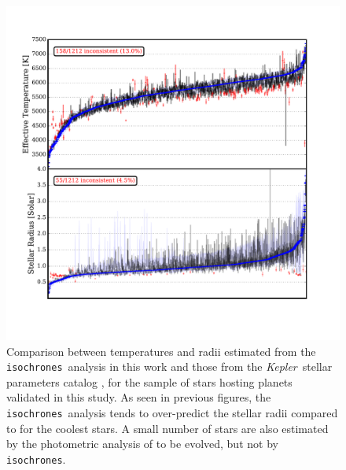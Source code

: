 \documentclass{emulateapj}
\newcommand{\figlabel}[1]{\label{fig:#1}}
\newcommand{\kepler}{\textit{Kepler}}
\newcommand{\isochrones}{\texttt{isochrones}}
\begin{document}
\begin{figure}[p]
\begin{center}
\includegraphics[width=7in]{figures/validated_compare.pdf}
\end{center}
\caption{Comparison between temperatures and radii estimated from the
  \isochrones\ analysis in this work and those from the
  \kepler\ stellar parameters catalog , for the 
  sample of stars hosting planets validated in this study.  As 
  seen in previous figures, the \isochrones\ analysis tends to 
  over-predict the stellar radii compared to  
  for the coolest stars.  A small number of stars are also estimated by 
  the photometric analysis of  to be evolved, 
  but not by \isochrones.
  \figlabel{validatedcompare}}
\end{figure}





\begin{turnpage}

\end{turnpage}
\end{document}
